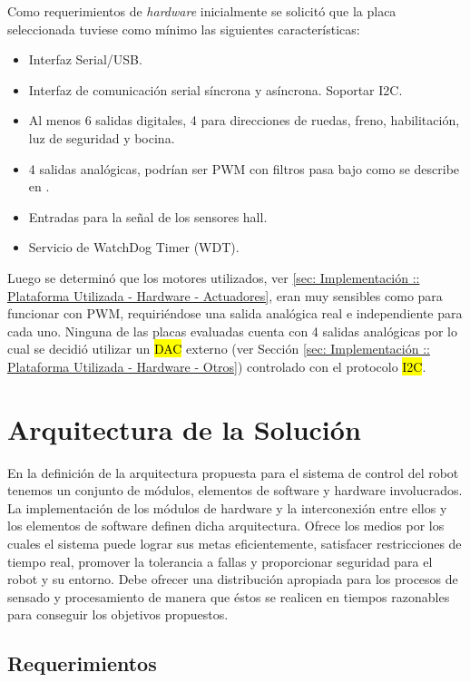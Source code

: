 \documentclass[withindex,glossary]{cam-thesis}
\begin{document}
Como requerimientos de \textit{hardware} inicialmente se solicitó que la placa seleccionada tuviese como mínimo las siguientes características:
\begin{itemize}
    \item Interfaz Serial/USB.
    \item Interfaz de comunicación serial síncrona y asíncrona. Soportar I2C.
    \item Al menos 6 salidas digitales, 4 para direcciones de ruedas, freno, habilitación, luz de seguridad y bocina.
    \item 4 salidas analógicas, podrían ser PWM con filtros pasa bajo como se describe en \cite{AN538}.
    \item Entradas para la señal de los sensores hall.
    \item Servicio de WatchDog Timer (WDT).
\end{itemize}
Luego se determinó que los motores utilizados, ver \ref{sec: Implementación :: Plataforma Utilizada - Hardware - Actuadores}, eran muy sensibles como para funcionar con PWM, requiriéndose una salida analógica real e independiente para cada  uno. Ninguna de las placas evaluadas cuenta con 4 salidas analógicas por lo cual se decidió utilizar un \hl{DAC} externo (ver Sección \ref{sec: Implementación :: Plataforma Utilizada - Hardware - Otros}) controlado con el protocolo \hl{I2C}.

\section{Arquitectura de la Solución}

En la definición de la arquitectura propuesta para el sistema de control del robot tenemos un conjunto de módulos, elementos de software y hardware involucrados. La implementación de los módulos de hardware y la interconexión entre ellos y los elementos de software definen dicha arquitectura.
Ofrece los medios por los cuales el sistema puede lograr sus metas eficientemente, satisfacer restricciones de tiempo real, promover la tolerancia a fallas y proporcionar seguridad para el robot y su entorno. Debe ofrecer una distribución apropiada para los procesos de sensado y procesamiento de manera que éstos se realicen en tiempos razonables para conseguir los objetivos propuestos.

\subsection{Requerimientos}
\end{document}
